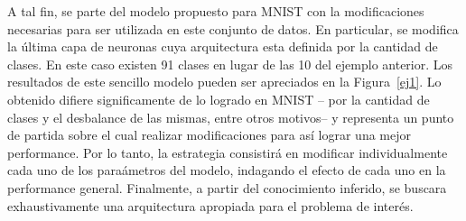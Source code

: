 \documentclass{article}[12pt, a4paper]
\begin{document}
A tal fin, se parte del modelo propuesto para MNIST con la modificaciones necesarias para ser utilizada
en este conjunto de datos. En particular, se modifica la \'ultima capa de neuronas cuya arquitectura
esta definida por la cantidad de clases. En este caso existen 91 clases en lugar de las 10 del ejemplo
anterior. Los resultados de este sencillo modelo pueden ser apreciados en la Figura~\ref{ej1}. Lo obtenido
difiere significamente de lo logrado en MNIST \--- por la cantidad de clases y el desbalance de las mismas,
entre otros motivos\--- y representa un punto de partida sobre el cual
realizar modificaciones para as\'i lograr una mejor performance. Por lo tanto, la estrategia consistir\'a
en modificar individualmente cada uno de los para\'ametros del modelo, indagando el efecto de cada
uno en la performance general. Finalmente, a partir del conocimiento inferido, se buscara exhaustivamente
una arquitectura apropiada para el problema de inter\'es.
\end{document}
